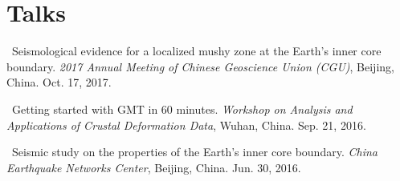 \section*{Talks}
\begin{etaremune}
\item
    \Tian\
    Seismological evidence for a localized mushy zone at the Earth's inner core boundary.
    \textit{2017 Annual Meeting of Chinese Geoscience Union (CGU)}, Beijing, China.
    Oct. 17, 2017.
    \invited
\item
    \Tian\
    Getting started with GMT in 60 minutes.
    \textit{Workshop on Analysis and Applications of Crustal Deformation Data}, Wuhan, China.
    Sep. 21, 2016.
    \invited
\item
    \Tian\
    Seismic study on the properties of the Earth's inner core boundary.
    \textit{China Earthquake Networks Center}, Beijing, China.
    Jun. 30, 2016.
    \invited
\end{etaremune}
